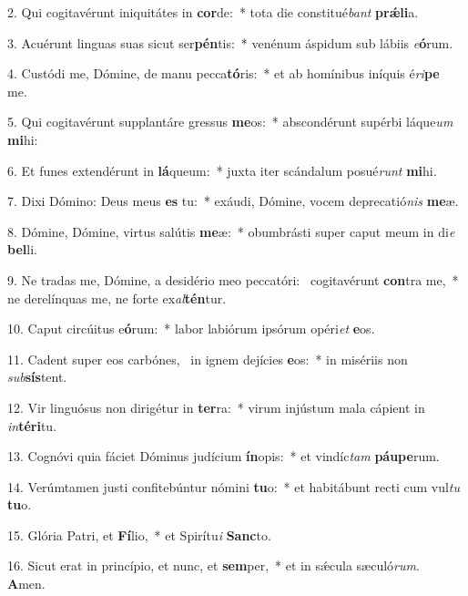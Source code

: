 2. Qui cogitavérunt iniquitátes in \textbf{cor}de:~*  tota die constitué\textit{bant} \textbf{prǽ}\textbf{li}a.\

3. Acuérunt linguas suas sicut ser\textbf{pén}tis:~*  venénum áspidum sub lábiis \textit{e}\textbf{ó}rum.\

4. Custódi me, Dómine, de manu pecca\textbf{tó}ris:~*  et ab homínibus iníquis é\textit{ri}\textbf{pe} me.\

5. Qui cogitavérunt supplantáre gressus \textbf{me}os:~*  abscondérunt supérbi láque\textit{um} \textbf{mi}hi:\

6. Et funes extendérunt in \textbf{lá}queum:~*  juxta iter scándalum posué\textit{runt} \textbf{mi}hi.\

7. Dixi Dómino: Deus meus \textbf{es} tu:~*  exáudi, Dómine, vocem deprecatió\textit{nis} \textbf{me}æ.\

8. Dómine, Dómine, virtus salútis \textbf{me}æ:~*  obumbrásti super caput meum in di\textit{e} \textbf{bel}li.\

9. Ne tradas me, Dómine, a desidério meo peccatóri: \dag\  cogitavérunt \textbf{con}tra me,~*  ne derelínquas me, ne forte ex\textit{al}\textbf{tén}tur.\

10. Caput circúitus e\textbf{ó}rum:~*  labor labiórum ipsórum opéri\textit{et} \textbf{e}os.\

11. Cadent super eos carbónes, \dag\  in ignem dejícies \textbf{e}os:~*  in misériis non \textit{sub}\textbf{sís}tent.\

12. Vir linguósus non dirigétur in \textbf{ter}ra:~*  virum injústum mala cápient in \textit{in}\textbf{tér}\textbf{i}tu.\

13. Cognóvi quia fáciet Dóminus judícium \textbf{ín}opis:~*  et vindíc\textit{tam} \textbf{páu}\textbf{pe}rum.\

14. Verúmtamen justi confitebúntur nómini \textbf{tu}o:~*  et habitábunt recti cum vul\textit{tu} \textbf{tu}o.\

15. Glória Patri, et \textbf{Fí}lio,~*  et Spirítu\textit{i} \textbf{Sanc}to.\

16. Sicut erat in princípio, et nunc, et \textbf{sem}per,~*  et in sǽcula sæculó\textit{rum}. \textbf{A}men.\

